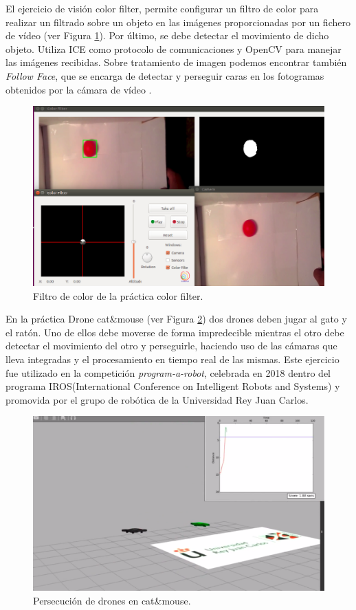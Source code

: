 \documentclass[12pt,spanish,chapterprefix, numbers=noenddot]{book}
\numberwithin{equation}{section}
\numberwithin{figure}{section}
\begin{document}
El ejercicio de visión color filter, permite configurar un filtro  de color para realizar un filtrado sobre un objeto en las imágenes proporcionadas por un fichero de vídeo (ver Figura \ref{fig:colorFilter}). Por último, se debe detectar el movimiento de dicho objeto. Utiliza ICE como protocolo de comunicaciones y OpenCV para manejar las imágenes recibidas. 
Sobre tratamiento de imagen podemos encontrar también \textit{Follow Face}, que se encarga de detectar y perseguir caras en los fotogramas obtenidos por la cámara de vídeo \cite{Carlos}. 

\begin{figure}[hbt!]
\centering
\includegraphics[width=12cm]{Figs/colorFilter.png}
\par
\caption{\label{fig:colorFilter}Filtro de color de la práctica color filter.}
\end{figure}

En la práctica Drone cat\&mouse (ver Figura \ref{fig:catMouse}) dos drones deben jugar al gato y el ratón. Uno de ellos debe moverse de forma impredecible mientras el otro debe detectar el movimiento del otro y perseguirle, haciendo uso de las cámaras que lleva integradas y el procesamiento en tiempo real de las mismas. Este ejercicio fue utilizado en la competición \textit{program-a-robot}, celebrada en 2018 dentro del programa IROS(International Conference on Intelligent Robots and Systems) y promovida por el grupo de robótica de la Universidad Rey Juan Carlos.

\begin{figure}[hbt!]
\centering
\includegraphics[width=12cm]{Figs/catMouse.png}
\par
\caption{\label{fig:catMouse}Persecución de drones en cat\&mouse.}
\end{figure}
\end{document}
